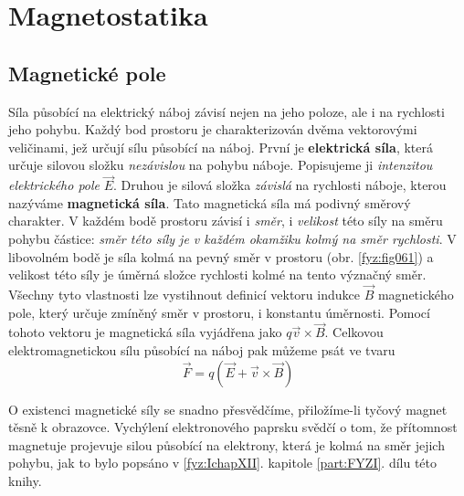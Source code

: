 \setchaptertoc
\chapter{Magnetostatika}\label{fyz:IIchapXIII}


  \section{Magnetické pole}\label{fyz:IIchapXIIIsecI}
    \cite[s.~224]{Feynman02} Síla působící na elektrický náboj závisí nejen na jeho poloze, ale i 
    na rychlosti jeho pohybu. Každý bod prostoru je charakterizován dvěma vektorovými veličinami, 
    jež určují sílu působící na náboj. První je \textbf{elektrická síla}, která určuje silovou 
    složku \emph{nezávislou} na pohybu náboje. Popisujeme ji \emph{intenzitou elektrického pole} 
    \(\vec{E}\). Druhou je silová složka \emph{závislá} na rychlosti náboje, kterou nazýváme 
    \textbf{magnetická síla}. Tato magnetická síla má podivný směrový charakter. V každém bodě 
    prostoru závisí i \emph{směr}, i \emph{velikost} této síly na směru pohybu částice: \emph{směr 
    této síly je v každém okamžiku kolmý na směr rychlosti}. V libovolném bodě je síla kolmá na 
    pevný směr v prostoru (obr. \ref{fyz:fig061}) a velikost této síly je úměrná složce 
    rychlosti kolmé na tento význačný směr. Všechny tyto vlastnosti lze vystihnout definicí vektoru 
    indukce \(\vec{B}\) magnetického pole, který určuje zmíněný směr v prostoru, i konstantu 
    úměrnosti. Pomocí tohoto vektoru je magnetická síla vyjádřena jako \(q\vec{v}\times\vec{B}\).
    Celkovou elektromagnetickou sílu působící na náboj pak můžeme psát ve tvaru
    \begin{equation}\label{fyz:eq823}
      \vec{F} = q(\vec{E} + \vec{v}\times\vec{B})
    \end{equation} 

    O existenci magnetické síly se snadno přesvědčíme, přiložíme-li tyčový magnet těsně k obrazovce.
    Vychýlení elektronového paprsku svědčí o tom, že přítomnost magnetuje projevuje silou působící
    na elektrony, která je kolmá na směr jejich pohybu, jak to bylo popsáno v \ref{fyz:IchapXII}.
    kapitole \ref{part:FYZI}. dílu této knihy.

